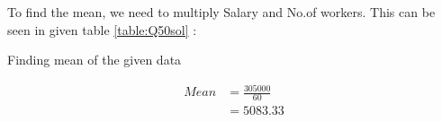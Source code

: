  To find the mean, we need to multiply Salary and No.of workers. This can be seen in given table \ref{table:Q50sol} :
\begin{table}[ht!]
\centering

\caption{Finding mean of the given data}
\label{table:Q50sol}	
\end{table}
\begin{align}
Mean &= \frac{305000}{60}\\
&= 5083.33
\end{align}

